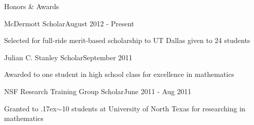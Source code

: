 \documentclass{resume} %
\begin{document}




\begin{rSection}{Honors \& Awards}

\begin{honors_section}{McDermott Scholar}{August 2012 - Present}
\item Selected for full-ride merit-based scholarship to UT Dallas given to 24 students
\end{honors_section}

\begin{honors_section}{Julian C. Stanley Scholar}{September 2011}
\item Awarded to one student in high school class for excellence in mathematics
\end{honors_section}

\begin{honors_section}{NSF Research Training Group Scholar}{June 2011 - Aug 2011}
\item Granted to {\raise.17ex\hbox{$\scriptstyle\sim$}}10 students at University of North Texas for researching in mathematics
\end{honors_section}




\end{rSection}
\end{document}
